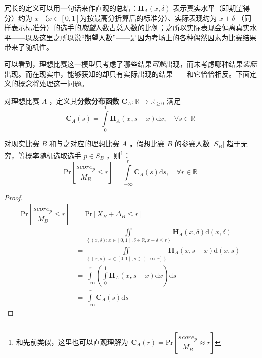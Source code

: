             冗长的定义可以用一句话来作直观的总结：$\bm{H}_A\left(x,\delta\right)$ 表示真实水平（即期望得分）约为 $x$ （$x\in\left[0,1\right]$为按最高分折算后的标准分）、实际表现约为 $x+\delta$ （同样表示标准分）的选手的\emph{期望}人数占总人数的比例；之所以实际表现会偏离真实水平——以及这里之所以说“期望人数”——是因为考场上的各种偶然因素为比赛结果带来了随机性。

            可以看到，理想比赛这一模型只考虑了哪些结果\emph{可能}出现，而未考虑哪种结果\emph{实际}出现。而在现实中，能够获知的却只有实际出现的结果——和它恰恰相反。下面定义的概念将处理这一问题。

            \begin{definition}[分数分布函数]
                对理想比赛 $A$ ，定义其\textbf{分数分布函数} $\bm{C}_A:\mathbb{R}\to\mathbb{R}_{\geq 0}$ 满足
                $$
                \bm{C}_A(s)=\int\limits_{0}^1 \bm{H}_A(x,s-x) \mathrm{d}x,\quad\forall s\in\mathbb{R}
                $$

                \label{def:scoreDistribution}
            \end{definition}

            \begin{proposition}[分数分布函数的实际含义]
                对现实比赛 $B$ 和与之对应的理想比赛 $A$ ，假想比赛 $B$ 的参赛人数 $|S_B|$ 趋于无穷，等概率随机选取选手 $p\in S_B$ ，则\footnote{和先前类似，这里也可以直观理解为 $\bm{C}_A(r)=\mathrm{Pr}\left[\dfrac{\textit{score}_p}{M_B}\approx r\right]$ }：
                $$
                \mathrm{Pr}\left[\dfrac{\textit{score}_p}{M_B}\leq r\right]=\int\limits_{-\infty}^r \bm{C}_A(s)\mathrm{d}s,\quad\forall r\in\mathbb{R}
                $$

                \label{prop:scoreDistributionMeaning}
            \end{proposition}

            \begin{proof}
                \begin{align*}
                    \mathrm{Pr}\left[\dfrac{\textit{score}_p}{M_B}\leq r\right]
                    &=\mathrm{Pr}\left[X_B+\Delta_B\leq r\right] \\
                    &=\iint\limits_{\left\{(x,\delta):x\in\left[0,1\right],\delta\in\mathbb{R},x+\delta\leq r\right\}}\bm{H}_A(x,\delta)\mathrm{d}(x,\delta) \\
                    &=\iint\limits_{\left\{(x,s):x\in\left[0,1\right],s\in\left(-\infty,r\right]\right\}}\bm{H}_A(x,s-x)\mathrm{d}(x,s) \\
                    &=\int\limits_{-\infty}^r\left(\int\limits_0^1 \bm{H}_A(x,s-x)\mathrm{d}x\right)\mathrm{d}s \\
                    &=\int\limits_{-\infty}^r \bm{C}_A(s)\mathrm{d}s
                \end{align*}
            \end{proof}

